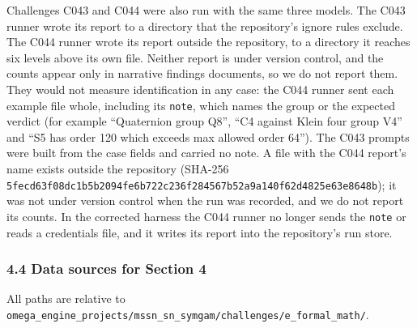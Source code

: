 \documentclass[
  11pt,
]{article}
\newcommand{\passthrough}[1]{#1}
\begin{document}
Challenges C043 and C044 were also run with the same three models. The
C043 runner wrote its report to a directory that the repository's ignore
rules exclude. The C044 runner wrote its report outside the repository,
to a directory it reaches six levels above its own file. Neither report
is under version control, and the counts appear only in narrative
findings documents, so we do not report them. They would not measure
identification in any case: the C044 runner sent each example file
whole, including its \passthrough{\lstinline!note!}, which names the
group or the expected verdict (for example ``Quaternion group Q8'', ``C4
against Klein four group V4'' and ``S5 has order 120 which exceeds max
allowed order 64''). The C043 prompts were built from the case fields
and carried no note. A file with the C044 report's name exists outside
the repository (SHA-256
\nolinkurl{5fecd63f08dc1b5b2094fe6b722c236f284567b52a9a140f62d4825e63e8648b});
it was not under version control when the run was recorded, and we do
not report its counts. In the corrected harness the C044 runner no
longer sends the \passthrough{\lstinline!note!} or reads a credentials
file, and it writes its report into the repository's run store.

\subsubsection{4.4 Data sources for Section
4}\label{data-sources-for-section-4}

All paths are relative to
\nolinkurl{omega_engine_projects/mssn_sn_symgam/challenges/e_formal_math/}.
\end{document}
